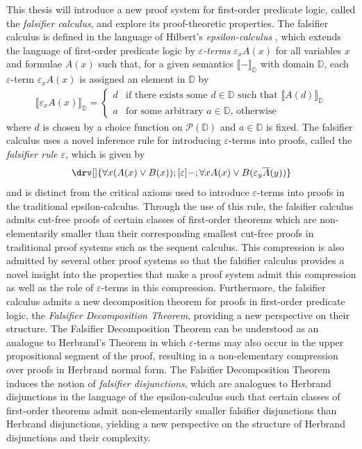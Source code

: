 \documentclass[10pt]{article}
\theoremstyle{definition}\newtheorem{remark}[theorem]{Remark}
\theoremstyle{definition}\newtheorem{example}[theorem]{Example}
\theoremstyle{definition}\newtheorem{definition}[theorem]{Definition}
\newcommand{\falsifierRule}{{\mathsf{\varepsilon}}}
\begin{document}
	This thesis will introduce a new proof system for first-order predicate logic, called the \textit{falsifier calculus}, and explore its proof-theoretic properties. The falsifier calculus is defined in the language of Hilbert's \textit{epsilon-calculus} \cite{HilbertFoundations}, which extends the language of first-order predicate logic by \textit{$\varepsilon$-terms} $\varepsilon_x A(x)$ for all variables $x$ and formulae $A(x)$ such that, for a given semantics $\llbracket - \rrbracket_{\mathbb{D}}$ with domain $\mathbb{D}$, each $\varepsilon$-term $\varepsilon_x A(x)$ is assigned an element in $\mathbb{D}$ by
	\begin{gather*}
		\llbracket \varepsilon_x A(x) \rrbracket_{\mathbb{D}} = \begin{cases}
			d & \text{if there exists some $d \in \mathbb{D}$ such that $\llbracket A(d) \rrbracket_\mathbb{D}$} \\
			a & \text{for some arbitrary $a \in \mathbb{D}$, otherwise}
		\end{cases}
	\end{gather*}
	where $d$ is chosen by a choice function on $\mathcal{P}(\mathbb{D})$ and $a \in \mathbb{D}$ is fixed. The falsifier calculus uses a novel inference rule for introducing $\varepsilon$-terms into proofs, called the \textit{falsifier rule $\falsifierRule$}, which is given by
	\[
		\drv[] {
			\forall x (A(x) \lor B(x)) ; [\falsifierRule]- ; \forall x A(x) \lor B(\varepsilon_y \overline{A}(y))
		}
	\]
	and is distinct from the critical axioms used to introduce $\varepsilon$-terms into proofs in the traditional epsilon-calculus. Through the use of this rule, the falsifier calculus admits cut-free proofs of certain classes of first-order theorems which are non-elementarily smaller than their corresponding smallest cut-free proofs in traditional proof systems such as the sequent calculus. This compression is also admitted by several other proof systems \cite{BaazUnsoundInferences, BaazLolicEpsilonShorterProofs} so that the falsifier calculus provides a novel insight into the properties that make a proof system admit this compression as well as the role of $\varepsilon$-terms in this compression. Furthermore, the falsifier calculus admits a new decomposition theorem for proofs in first-order predicate logic, the \textit{Falsifier Decomposition Theorem}, providing a new perspective on their structure. The Falsifier Decomposition Theorem can be understood as an analogue to Herbrand's Theorem in which $\varepsilon$-terms may also occur in the upper propositional segment of the proof, resulting in a non-elementary compression over proofs in Herbrand normal form. The Falsifier Decomposition Theorem induces the notion of \textit{falsifier disjunctions}, which are analogues to Herbrand disjunctions in the language of the epsilon-calculus such that certain classes of first-order theorems admit non-elementarily smaller falsifier disjunctions than Herbrand disjunctions, yielding a new perspective on the structure of Herbrand disjunctions and their complexity.
	
\end{document}
